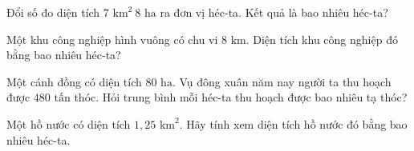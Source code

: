 \begin{ex} %
Đổi số đo diện tích $7\text{ km}^2\ 8\text{ ha}$ ra đơn vị héc-ta. Kết quả là bao nhiêu héc-ta?
\end{ex}

\begin{ex} %
Một khu công nghiệp hình vuông có chu vi $8\text{ km}$. Diện tích khu công nghiệp đó bằng bao nhiêu héc-ta?
\end{ex}

\begin{ex} %
Một cánh đồng có diện tích $80\text{ ha}$. Vụ đông xuân năm nay người ta thu hoạch được $480\text{ tấn}$ thóc. Hỏi trung bình mỗi héc-ta thu hoạch được bao nhiêu tạ thóc?
\end{ex}

\begin{ex} %
Một hồ nước có diện tích $1{,}25\text{ km}^2$. Hãy tính xem diện tích hồ nước đó bằng bao nhiêu héc-ta.
\end{ex}
